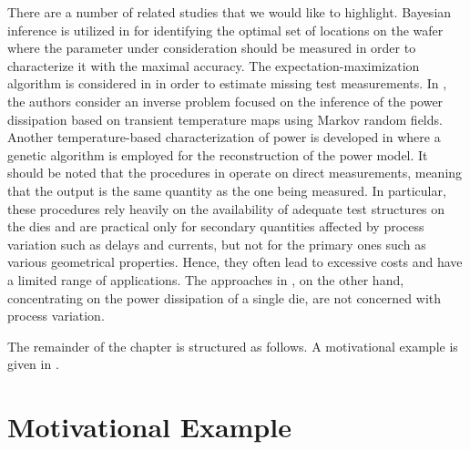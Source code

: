 There are a number of related studies that we would like to highlight. Bayesian
inference is utilized in \cite{zhang2010} for identifying the optimal set of
locations on the wafer where the parameter under consideration should be
measured in order to characterize it with the maximal accuracy. The
expectation-maximization algorithm is considered in \cite{reda2009} in order to
estimate missing test measurements. In \cite{paek2012}, the authors consider an
inverse problem focused on the inference of the power dissipation based on
transient temperature maps using Markov random fields. Another temperature-based
characterization of power is developed in \cite{mesa-martinez2007} where a
genetic algorithm is employed for the reconstruction of the power model. It
should be noted that the procedures in \cite{zhang2010, reda2009} operate on
direct measurements, meaning that the output is the same quantity as the one
being measured. In particular, these procedures rely heavily on the availability
of adequate test structures on the dies and are practical only for secondary
quantities affected by process variation such as delays and currents, but not
for the primary ones such as various geometrical properties. Hence, they often
lead to excessive costs and have a limited range of applications. The approaches
in \cite{paek2012, mesa-martinez2007}, on the other hand, concentrating on the
power dissipation of a single die, are not concerned with process variation.

The remainder of the chapter is structured as follows. A motivational example is
given in .

\section{Motivational Example}

